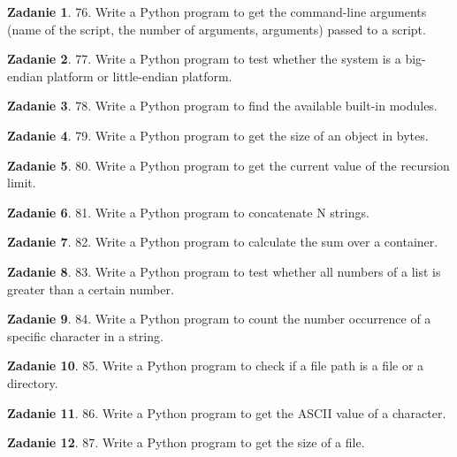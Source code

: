 \documentclass[11pt]{article}
\theoremstyle{definition}
\newtheorem{zadanie}{Zadanie}
\begin{document}
\begin{zadanie}
76. Write a Python program to get the command-line arguments (name of the script, the number of arguments, arguments) passed to a script.
\end{zadanie}

\begin{zadanie}
77. Write a Python program to test whether the system is a big-endian platform or little-endian platform.
\end{zadanie}

\begin{zadanie}
78. Write a Python program to find the available built-in modules.
\end{zadanie}

\begin{zadanie}
79. Write a Python program to get the size of an object in bytes.
\end{zadanie}

\begin{zadanie}
80. Write a Python program to get the current value of the recursion limit.
\end{zadanie}

\begin{zadanie}
81. Write a Python program to concatenate N strings.
\end{zadanie}

\begin{zadanie}
82. Write a Python program to calculate the sum over a container.
\end{zadanie}

\begin{zadanie}
83. Write a Python program to test whether all numbers of a list is greater than a certain number.
\end{zadanie}

\begin{zadanie}
84. Write a Python program to count the number occurrence of a specific character in a string.
\end{zadanie}

\begin{zadanie}
85. Write a Python program to check if a file path is a file or a directory.
\end{zadanie}

\begin{zadanie}
86. Write a Python program to get the ASCII value of a character.
\end{zadanie}

\begin{zadanie}
87. Write a Python program to get the size of a file.
\end{zadanie}
\end{document}

